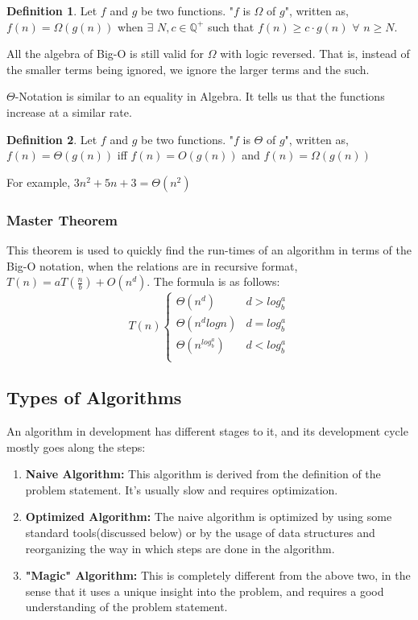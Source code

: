 \documentclass{article}
\theoremstyle{definition}
\newtheorem*{definition}{Definition}
\theoremstyle{example}
\begin{document}
\theoremstyle{definition}
\begin{definition}{}
    Let $f$ and $g$ be two functions. "$f$ is $\Omega$ of $g$", written as, $f(n) = \Omega(g(n))$ when $\exists$ $N, c \in \mathbb{Q}^+$ such that $f(n) \geq c\cdot g(n)$ $\forall$ $n\geq N$.
\end{definition}
\vspace{4mm}
All the algebra of Big-O is still valid for $\Omega$ with logic reversed. That is, instead of the smaller terms being ignored, we ignore the larger terms and the such.\par
\vspace{5mm}
$\Theta$-Notation is similar to an equality in Algebra. It tells us that the functions increase at a similar rate.
\theoremstyle{definition}
\begin{definition}{}
    Let $f$ and $g$ be two functions. "$f$ is $\Theta$ of $g$", written as, $f(n) = \Theta(g(n))$ iff $f(n) = O(g(n))$ and $f(n) = \Omega(g(n))$
\end{definition}
For example, $3n^2+5n+3 = \Theta(n^2)$

\subsubsection{\Large Master Theorem}
\hspace{4mm} This theorem is used to quickly find the run-times of an algorithm in terms of the Big-O notation, when the relations are in recursive format, \(T(n) = aT(\frac{n}{b}) + O(n^d)\). The formula is as follows:
\[   T(n)\left\{
\begin{array}{ll}
      \Theta(n^d) & d > log_b^a \\
      \Theta(n^dlogn) & d = log_b^a \\
      \Theta(n^{log_b^a}) & d < log_b^a \\
\end{array} 
\right. \]

\subsection{\Large Types of Algorithms}
\hspace{5mm} An algorithm in development has different stages to it, and its development cycle mostly goes along the steps:

\begin{enumerate}
    \item \textbf{Naive Algorithm:} This algorithm is derived from the definition of the problem statement. It's usually slow and requires optimization.
    \item \textbf{Optimized Algorithm:} The naive algorithm is optimized by using some standard tools(discussed below) or by the usage of data structures and reorganizing the way in which steps are done in the algorithm.
    \item \textbf{"Magic" Algorithm:} This is completely different from the above two, in the sense that it uses a unique insight into the problem, and requires a good understanding of the problem statement.
\end{enumerate}
\end{document}
